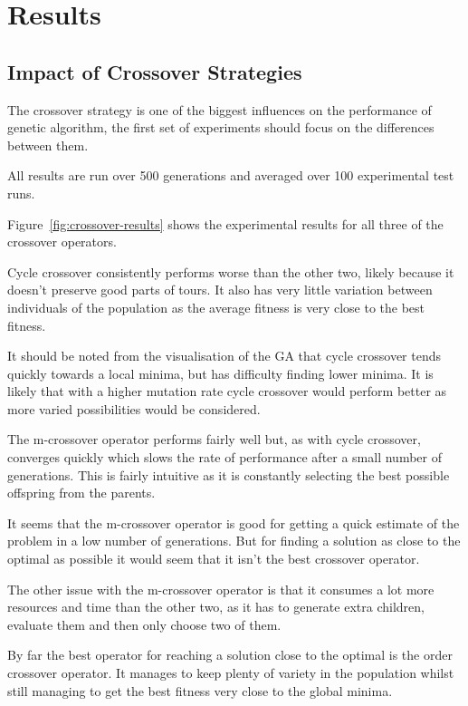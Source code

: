 \documentclass[10pt, a4paper]{article}
\begin{document}
 
\section{Results}
\label{sec:results}

\subsection{Impact of Crossover Strategies}
The crossover strategy is one of the biggest influences on the performance of
genetic algorithm, the first set of experiments should focus on the differences
between them.

All results are run over 500 generations and averaged over 100 experimental 
test runs.

Figure~\ref{fig:crossover-results} shows the experimental results for all three
of the crossover operators.

Cycle crossover consistently performs worse than the other two, likely because
it doesn't preserve good parts of tours. It also has very little variation
between individuals of the population as the average fitness is very close to
the best fitness.

It should be noted from the visualisation of the GA that cycle crossover tends
quickly towards a local minima, but has difficulty finding lower minima. It is
likely that with a higher mutation rate cycle crossover would perform better as
more varied possibilities would be considered.

The m-crossover operator performs fairly well but, as with cycle crossover,
converges quickly which slows the rate of performance after a small number of
generations. This is fairly intuitive as it is constantly selecting the best
possible offspring from the parents.

It seems that the m-crossover operator is good for getting a quick estimate of
the problem in a low number of generations. But for finding a solution as close
to the optimal as possible it would seem that it isn't the best crossover
operator. %

The other issue with the m-crossover operator is that it consumes a lot more
resources and time than the other two, as it has to generate extra children,
evaluate them and then only choose two of them.

By far the best operator for reaching a solution close to the optimal is the
order crossover operator. It manages to keep plenty of variety in the 
population whilst still managing to get the best fitness very close to the
global minima.
\end{document}
